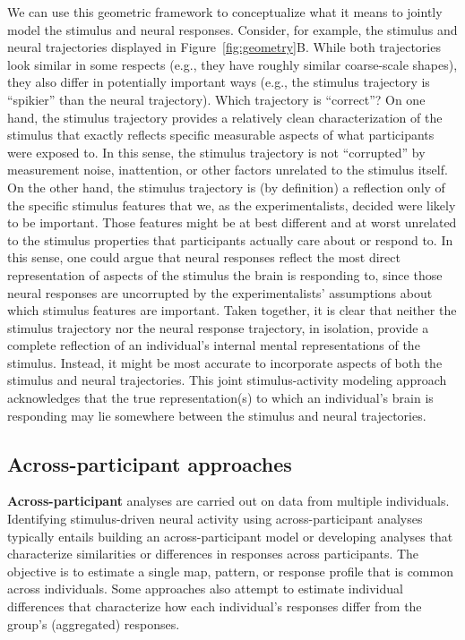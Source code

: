 \documentclass{llmxive}
\begin{document}
We can use this geometric framework to conceptualize what it means to
jointly model the stimulus and neural responses.  Consider, for
example, the stimulus and neural trajectories displayed in
Figure~\ref{fig:geometry}B.  While both trajectories look similar in
some respects (e.g., they have roughly similar coarse-scale shapes),
they also differ in potentially important ways (e.g., the stimulus
trajectory is ``spikier'' than the neural trajectory).  Which
trajectory is ``correct''?  On one hand, the stimulus trajectory
provides a relatively clean characterization of the stimulus that
exactly reflects specific measurable aspects of what participants were
exposed to.  In this sense, the stimulus trajectory is not
``corrupted'' by measurement noise, inattention, or other factors
unrelated to the stimulus itself.  On the other hand, the stimulus
trajectory is (by definition) a reflection only of the specific
stimulus features that we, as the experimentalists, decided were
likely to be important.  Those features might be at best different and
at worst unrelated to the stimulus properties that participants
actually care about or respond to.  In this sense, one could argue
that neural responses reflect the most direct representation of
aspects of the stimulus the brain is responding to, since those neural
responses are uncorrupted by the experimentalists' assumptions about
which stimulus features are important.  Taken together, it is clear
that neither the stimulus trajectory nor the neural response
trajectory, in isolation, provide a complete reflection of an
individual's internal mental representations of the stimulus.
Instead, it might be most accurate to incorporate aspects of both the
stimulus and neural trajectories.  This joint stimulus-activity
modeling approach acknowledges that the true representation(s) to
which an individual's brain is responding may lie somewhere between
the stimulus and neural trajectories.

\subsection{Across-participant approaches}
\textbf{Across-participant} analyses are carried out on data from
multiple individuals.  Identifying stimulus-driven neural activity
using across-participant analyses typically entails building an
across-participant model or developing analyses that characterize
similarities or differences in responses across participants.  The
objective is to estimate a single map, pattern, or response profile
that is common across individuals.  Some approaches also attempt to
estimate individual differences that characterize how each
individual's responses differ from the group's (aggregated) responses.
\end{document}
